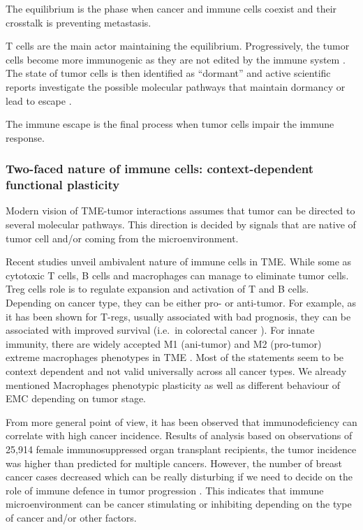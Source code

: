 \documentclass[12pt,]{book}
\theoremstyle{definition}
\theoremstyle{definition}
\theoremstyle{definition}
\theoremstyle{remark}
\begin{document}
The equilibrium is the phase when cancer and immune cells coexist and
their crosstalk is preventing metastasis.

T cells are the main actor maintaining the equilibrium. Progressively,
the tumor cells become more immunogenic as they are not edited by the
immune system \citep{Bhatia2011}. The state of tumor cells is then
identified as ``dormant'' and active scientific reports investigate the
possible molecular pathways that maintain dormancy or lead to escape
\citep{Teng2008}.

The immune escape is the final process when tumor cells impair the
immune response.

\hypertarget{two-faced-nature-of-immune-cells-context-dependent-functional-plasticity}{%
\subsubsection{Two-faced nature of immune cells: context-dependent
functional
plasticity}\label{two-faced-nature-of-immune-cells-context-dependent-functional-plasticity}}

Modern vision of TME-tumor interactions assumes that tumor can be
directed to several molecular pathways. This direction is decided by
signals that are native of tumor cell and/or coming from the
microenvironment.

Recent studies unveil ambivalent nature of immune cells in TME. While
some as cytotoxic T cells, B cells and macrophages can manage to
eliminate tumor cells. Treg cells role is to regulate expansion and
activation of T and B cells. Depending on cancer type, they can be
either pro- or anti-tumor. For example, as it has been shown for T-regs,
usually associated with bad prognosis, they can be associated with
improved survival (i.e.~in colorectal cancer \citep{Frey2010}). For
innate immunity, there are widely accepted M1 (ani-tumor) and M2
(pro-tumor) extreme macrophages phenotypes in TME \citep{Qian2010}. Most
of the statements seem to be context dependent and not valid universally
across all cancer types. We already mentioned Macrophages phenotypic
plasticity as well as different behaviour of EMC depending on tumor
stage.

From more general point of view, it has been observed that
immunodeficiency can correlate with high cancer incidence. Results of
analysis based on observations of 25,914 female immunosuppressed organ
transplant recipients, the tumor incidence was higher than predicted for
multiple cancers. However, the number of breast cancer cases decreased
which can be really disturbing if we need to decide on the role of
immune defence in tumor progression \citep{Stewart1995}. This indicates
that immune microenvironment can be cancer stimulating or inhibiting
depending on the type of cancer and/or other factors.
\end{document}
